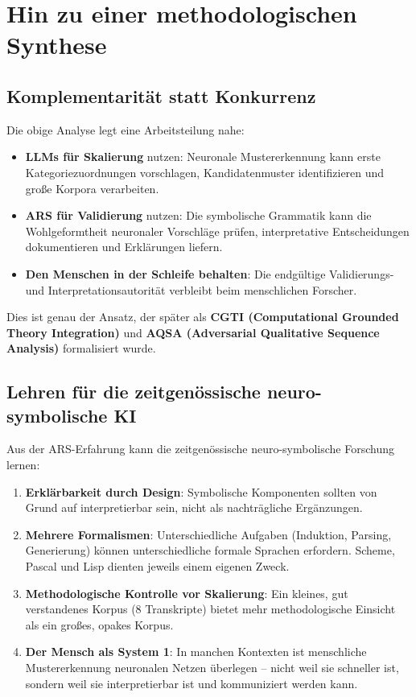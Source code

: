 \documentclass[12pt,a4paper]{article}
\begin{document}
\section{Hin zu einer methodologischen Synthese}

\subsection{Komplementarität statt Konkurrenz}

Die obige Analyse legt eine Arbeitsteilung nahe:

\begin{itemize}
    \item \textbf{LLMs für Skalierung} nutzen: Neuronale Mustererkennung kann 
    erste Kategoriezuordnungen vorschlagen, Kandidatenmuster identifizieren 
    und große Korpora verarbeiten.
    \item \textbf{ARS für Validierung} nutzen: Die symbolische Grammatik kann 
    die Wohlgeformtheit neuronaler Vorschläge prüfen, interpretative 
    Entscheidungen dokumentieren und Erklärungen liefern.
    \item \textbf{Den Menschen in der Schleife behalten}: Die endgültige 
    Validierungs- und Interpretationsautorität verbleibt beim menschlichen 
    Forscher.
\end{itemize}

Dies ist genau der Ansatz, der später als \textbf{CGTI (Computational Grounded 
Theory Integration)} und \textbf{AQSA (Adversarial Qualitative Sequence 
Analysis)} formalisiert wurde.

\subsection{Lehren für die zeitgenössische neuro-symbolische KI}

Aus der ARS-Erfahrung kann die zeitgenössische neuro-symbolische Forschung 
lernen:

\begin{enumerate}
    \item \textbf{Erklärbarkeit durch Design}: Symbolische Komponenten sollten 
    von Grund auf interpretierbar sein, nicht als nachträgliche Ergänzungen.
    
    \item \textbf{Mehrere Formalismen}: Unterschiedliche Aufgaben (Induktion, 
    Parsing, Generierung) können unterschiedliche formale Sprachen erfordern. 
    Scheme, Pascal und Lisp dienten jeweils einem eigenen Zweck.
    
    \item \textbf{Methodologische Kontrolle vor Skalierung}: Ein kleines, gut 
    verstandenes Korpus (8 Transkripte) bietet mehr methodologische Einsicht 
    als ein großes, opakes Korpus.
    
    \item \textbf{Der Mensch als System 1}: In manchen Kontexten ist menschliche 
    Mustererkennung neuronalen Netzen überlegen – nicht weil sie schneller ist, 
    sondern weil sie interpretierbar ist und kommuniziert werden kann.
\end{enumerate}
\end{document}

